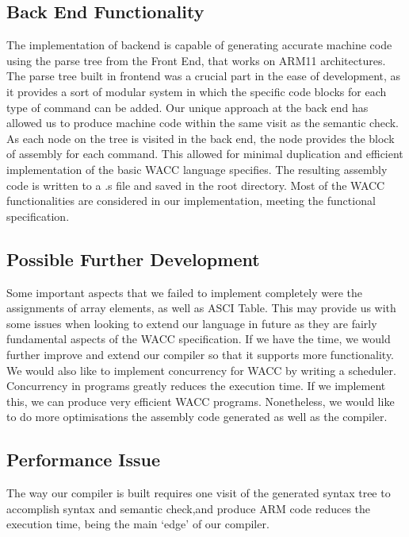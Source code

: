 \documentclass[a4paper]{article}
\theoremstyle{definition}
\begin{document}
\subsection{Back End Functionality}
The implementation of backend is capable of generating accurate machine code using the parse tree from the Front End, that works on ARM11 architectures. The parse tree built in frontend was a crucial part in the ease of development, as it provides a sort of modular system in which the specific code blocks for each type of command can be added. Our unique approach at the back end has allowed us to produce machine code within the same visit as the semantic check.  As each node on the tree is visited in the back end, the node provides the block of assembly for each command. This allowed for minimal duplication and efficient implementation of the basic WACC language specifies. The resulting assembly code is written to a .s file and saved in the root directory. Most of the WACC functionalities are considered in our implementation, meeting the functional specification.

\subsection{Possible Further Development}
Some important aspects that we failed to implement completely were the assignments of array elements, as well as ASCI Table. This may provide us with some issues when looking to extend our language in future as they are fairly fundamental aspects of the WACC specification. If we have the time, we would further improve and extend our compiler so that it supports more functionality. We would also like to implement concurrency for WACC by writing a scheduler. Concurrency in programs greatly reduces the execution time. If we implement this, we can produce very efficient WACC programs. Nonetheless, we would like to do more optimisations the assembly code generated as well as the compiler.


\subsection{Performance Issue}
The way our compiler is built requires one visit of the generated syntax tree to accomplish syntax and semantic check,and produce ARM code reduces the execution time, being the main ‘edge’ of our compiler.
\end{document}
